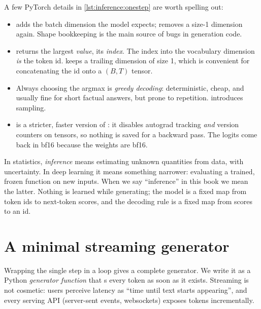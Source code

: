 A few PyTorch details in \cref{lst:inference:onestep} are worth spelling out:
\begin{itemize}
  \item {} adds the batch dimension the model expects;  removes a
    size-1 dimension again. Shape bookkeeping is the main source of bugs in generation code.
  \item {} returns the largest \emph{value},  its \emph{index}. The index
    into the vocabulary dimension \emph{is} the token id.  keeps a trailing
    dimension of size 1, which is convenient for concatenating the id onto a $(B,T)$ tensor.
  \item Always choosing the argmax is \emph{greedy decoding}: deterministic, cheap, and usually
    fine for short factual answers, but prone to repetition.  introduces sampling.
  \item {} is a stricter, faster version of : it
    disables autograd tracking \emph{and} version counters on tensors, so nothing is saved for a
    backward pass. The logits come back in bf16 because the weights are bf16.
\end{itemize}

\begin{deepdive}
In statistics, \emph{inference} means estimating unknown quantities from data, with uncertainty.
In deep learning it means something narrower: evaluating a trained, frozen function on new inputs.
When we say ``inference'' in this book we mean the latter. Nothing is learned while generating;
the model is a fixed map from token ids to next-token scores, and the decoding rule is a fixed map
from scores to an id.
\end{deepdive}

\section{A minimal streaming generator}\label{sec:inference:generator}

Wrapping the single step in a loop gives a complete generator. We write it as a Python
\emph{generator function} that s every token as soon as it exists. Streaming is not
cosmetic: users perceive latency as ``time until text starts appearing'', and every serving API
(server-sent events, websockets) exposes tokens incrementally.

